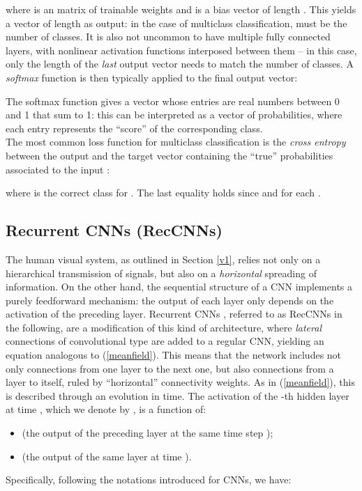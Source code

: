 \documentclass[11pt,oneside,reqno]{amsart}
\begin{document}
 where  is an  matrix of trainable weights and  is a bias vector of length . This yields a vector of length  as output: in the case of multiclass classification,  must be the number of classes. It is also not uncommon to have multiple fully connected layers, with nonlinear activation functions interposed between them -- in this case, only the length of the \emph{last} output vector needs to match the number of classes. A \emph{softmax} function  is then typically applied to the final output vector:
 
 The softmax function gives a vector whose entries are real numbers between 0 and 1 that sum to 1: this can be interpreted as a vector of probabilities, where each entry represents the ``score'' of the corresponding class.\\
 The most common loss function for multiclass classification is the \emph{cross entropy} between the output  and the target vector  containing the ``true'' probabilities associated to the input :
 
 where  is the correct class for . The last equality holds since  and  for each .

 \subsection{Recurrent CNNs (RecCNNs)}\label{reccnns}
 
 The human visual system, as outlined in Section \ref{v1}, relies not only on a hierarchical transmission of signals, but also on a \emph{horizontal} spreading of information. On the other hand, the sequential structure of a CNN implements a purely feedforward mechanism: the output of each layer only depends on the activation of the preceding layer. Recurrent CNNs \citep{liang,spoerer}, referred to as RecCNNs in the following, are a modification of this kind of architecture, where \emph{lateral} connections of convolutional type are added to a regular CNN, yielding an equation analogous to (\ref{meanfield}). This means that the network includes not only connections from one layer to the next one, but also connections from a layer to itself, ruled by ``horizontal'' connectivity weights. As in (\ref{meanfield}), this is described through an evolution in time. The activation of the -th hidden layer at time , which we denote by , is a function of:
 \begin{itemize}
  \item  (the output of the preceding layer at the same time step );
  \item  (the output of the same layer at time ).
 \end{itemize}
 Specifically, following the notations introduced for CNNs, we have:
 
\end{document}
